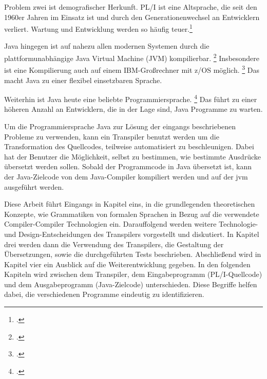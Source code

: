 Problem zwei ist demografischer Herkunft. PL/I ist eine Altsprache, die seit den 1960er Jahren im Einsatz ist und durch den Generationenwechsel an Entwicklern verliert. Wartung und Entwicklung werden so häufig teuer.\footcite[Vgl. ][S. 227ff.]{histopli} 

Java hingegen ist auf nahezu allen modernen Systemen durch die plattformunabhängige Java Virtual Machine (JVM) kompilierbar. \footcite[Vgl. ][]{jvm}
Insbesondere ist eine Kompilierung auch auf einem IBM-Großrechner mit z/OS möglich. \footcite[Vgl. ][]{zos} 
Das macht Java zu einer flexibel einsetzbaren Sprache. 

Weiterhin ist Java heute eine beliebte Programmiersprache. \footcite[Vgl. ][]{tiobe} Das führt zu einer höheren Anzahl an Entwicklern, die in der Lage sind, Java Programme zu warten.

Um die Programmiersprache Java zur Lösung der eingangs beschriebenen Probleme zu verwenden, kann ein Transpiler benutzt werden um die Transformation des Quellcodes, teilweise automatisiert zu beschleunigen. 
Dabei hat der Benutzer die Möglichkeit, selbst zu bestimmen, wie bestimmte Ausdrücke übersetzt werden sollen. Sobald der Programmcode in Java übersetzt ist, kann der Java-Zielcode von dem Java-Compiler kompiliert werden und auf der \ac{jvm} ausgeführt werden.

Diese Arbeit führt Eingangs in Kapitel eins, in die grundlegenden theoretischen Konzepte, wie Grammatiken von formalen Sprachen in Bezug auf die verwendete Compiler-Compiler Technologien ein. Darauffolgend werden weitere Technologie- und Design-Entscheidungen des Transpilers vorgestellt und diskutiert. In Kapitel drei werden dann die Verwendung des Transpilers, die Gestaltung der Übersetzungen, sowie die durchgeführten Tests beschrieben. Abschließend wird in Kapitel vier ein Ausblick auf die Weiterentwicklung gegeben.
In den folgenden Kapiteln wird zwischen dem Transpiler, dem Eingabeprogramm (PL/I-Quellcode) und dem Ausgabeprogramm (Java-Zielcode) unterschieden. Diese Begriffe helfen dabei, die verschiedenen Programme eindeutig zu identifizieren. 


     



